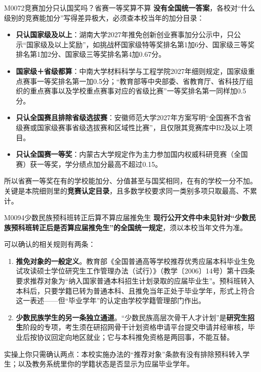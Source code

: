 \begin{qa}{M0072}{竞赛加分只认国奖吗？省赛一等奖算不算}
\textbf{没有全国统一答案}，各校对“什么级别的竞赛能加分”写得差异极大，必须查本校当年的加分目录：

\begin{itemize}
  \item \textbf{只认国家级及以上}：湖南大学2027年推免创新创业赛事加分公示中，只公示“国家级及以上奖励”，如挑战杯国家级特等奖排名第1加6分、国家级三等奖排名第1加2分、国家级三等奖排名第4加0.67分。
  \item \textbf{国家级＋省级都算}：中南大学材料科学与工程学院2027年细则规定，国家级重点赛事一等奖排名第一加0.5分；“教育部等中央部委、省教育厅、省科技厅组织的重点赛事以及学校重点赛事对应的省级比赛”一等奖排名第一同样加0.5分。
  \item \textbf{只认全国赛且排除省级选拔赛}：安徽师范大学2027年方案写明“全国赛不含省级赛或国家级赛事省级选拔赛和区域性比赛”，且仅限其竞赛库中B2及以上项目。
  \item \textbf{只认全国赛一等奖}：内蒙古大学规定作为主力参加国内权威科研竞赛（全国赛）获一等奖，学分绩点加分最高不超过0.15。
\end{itemize}

所以省赛一等奖在有的学校能加分、分值甚至与国奖相同，在有的学校一分不加。关键是本院细则里的\textbf{竞赛认定目录}，且多数学校要求同一类别多项只取最高、不累计。
\end{qa}

\begin{qa}{M0094}{少数民族预科班转正后算不算应届推免生}
\textbf{现行公开文件中未见针对“少数民族预科班转正后是否算应届推免生”的全国统一规定}，须以本校当年文件为准。

可以确认的相关规则有两条：

\begin{enumerate}
  \item \textbf{推免对象的一般定义}。教育部《全国普通高等学校推荐优秀应届本科毕业生免试攻读硕士学位研究生工作管理办法（试行）》（教学〔2006〕14号）第十四条要求推荐对象为“纳入国家普通本科招生计划录取的应届毕业生”。预科班转入本科后，只要学籍已转为普通本科、且推免当年正处于毕业学年，形式上符合这一表述——但“毕业学年”的认定由学校学籍管理部门作出。
  \item \textbf{少数民族学生的另一条独立通道}。“少数民族高层次骨干人才计划”是\textbf{研究生招生}阶段的专项，考生须在研招网骨干计划资格申请平台提交申请并经审核，毕业后按协议回定向地区就业；它与本科推免资格是两回事，不能互替。
\end{enumerate}

实操上你只需确认两点：本校实施办法的“推荐对象”条款有没有排除预科转入学生；以及教务系统里你的学籍状态是否显示为应届毕业学年。
\end{qa}

